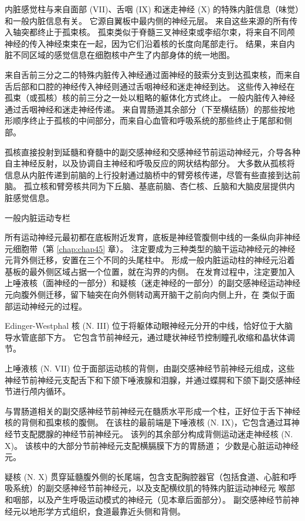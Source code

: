 内脏感觉柱与来自面部 (VII)、舌咽 (IX) 和迷走神经 (X) 的特殊内脏信息（味觉）和一般内脏信息有关。 它源自翼板中最内侧的神经元层。 来自这些来源的所有传入轴突都终止于孤束核。 孤束类似于脊髓三叉神经束或李绍尔束，将来自不同颅神经的传入神经束束在一起，因为它们沿着核的长度向尾部走行。 结果，来自内脏不同区域的感觉信息在细胞核中产生了内部身体的统一地图。

来自舌前三分之二的特殊内脏传入神经通过面神经的鼓索分支到达孤束核，而来自舌后部和口腔的神经传入神经则通过舌咽神经和迷走神经到达。 这些传入神经在孤束（或孤核）核的前三分之一处以粗略的躯体化方式终止。 一般内脏传入神经通过舌咽神经和迷走神经传递。 来自胃肠道其余部分（下至横结肠）的那些按地形顺序终止于孤核的中间部分，而来自心血管和呼吸系统的那些终止于尾部和侧部。

孤核直接投射到延髓和脊髓中的副交感神经和交感神经节前运动神经元，介导各种自主神经反射，以及协调自主神经和呼吸反应的网状结构部分。 大多数从孤核将信息从内脏传递到前脑的上行投射通过脑桥中的臂旁核传递，尽管有些直接到达前脑。 孤立核和臂旁核共同为下丘脑、基底前脑、杏仁核、丘脑和大脑皮层提供内脏感觉信息。

一般内脏运动专栏

所有运动神经元最初都在底板附近发育，底板是神经管腹侧中线的一条纵向非神经元细胞带（第 \ref{chap:chap45} 章）。 注定要成为三种类型的脑干运动神经元的神经元背外侧迁移，安置在三个不同的头尾柱中。 形成一般内脏运动柱的神经元沿着基板的最外侧区域占据一个位置，就在沟界的内侧。 在发育过程中，注定要加入上唾液核（面神经的一部分）和疑核（迷走神经的一部分）的副交感神经运动神经元向腹外侧迁移，留下轴突在向外侧转动离开脑干之前向内侧上升，在 类似于面部运动神经元的过程。

Edinger-Westphal 核 (N. III) 位于将躯体动眼神经元分开的中线，恰好位于大脑导水管底部下方。 它包含节前神经元，通过睫状神经节控制瞳孔收缩和晶状体调节。

上唾液核 (N. VII) 位于面部运动核的背侧，由副交感神经节前神经元组成，这些神经节前神经元支配舌下和下颌下唾液腺和泪腺，并通过蝶腭和下颌下副交感神经节进行颅内循环。

与胃肠道相关的副交感神经节前神经元在髓质水平形成一个柱，正好位于舌下神经核的背侧和孤束核的腹侧。 在该柱的最前端是下唾液核 (N. IX)，它包含通过耳神经节支配腮腺的神经节前神经元。 该列的其余部分构成背侧运动迷走神经核 (N. X)。 该核中的大部分节前神经元支配横膈膜下方的胃肠道； 少数是心脏运动神经元。

疑核 (N. X) 贯穿延髓腹外侧的长尾端，包含支配胸腔器官（包括食道、心脏和呼吸系统）的副交感神经节前神经元，以及支配横纹肌的特殊内脏运动神经元 喉部和咽部，以及产生呼吸运动模式的神经元（见本章后面部分）。 副交感神经节前神经元以地形学方式组织，食道最靠近头侧和背侧。

